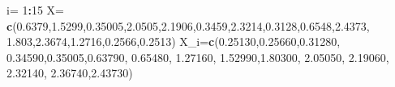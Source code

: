 \documentclass[
  a4paper,
  oneside,
  openany]{book}
\newenvironment{Shaded}{\begin{snugshade}}{\end{snugshade}}
\newcommand{\DecValTok}[1]{\textcolor[rgb]{0.00,0.00,0.81}{#1}}
\newcommand{\FloatTok}[1]{\textcolor[rgb]{0.00,0.00,0.81}{#1}}
\newcommand{\KeywordTok}[1]{\textcolor[rgb]{0.13,0.29,0.53}{\textbf{#1}}}
\newcommand{\NormalTok}[1]{#1}
\newcommand{\OperatorTok}[1]{\textcolor[rgb]{0.81,0.36,0.00}{\textbf{#1}}}
\newcommand{\StringTok}[1]{\textcolor[rgb]{0.31,0.60,0.02}{#1}}
\begin{document}
\begin{Shaded}
\begin{Highlighting}[]
\NormalTok{i=}\StringTok{ }\DecValTok{1}\OperatorTok{:}\DecValTok{15}
\NormalTok{X=}\StringTok{ }\KeywordTok{c}\NormalTok{(}\FloatTok{0.6379}\NormalTok{,}\FloatTok{1.5299}\NormalTok{,}\FloatTok{0.35005}\NormalTok{,}\FloatTok{2.0505}\NormalTok{,}\FloatTok{2.1906}\NormalTok{,}\FloatTok{0.3459}\NormalTok{,}\FloatTok{2.3214}\NormalTok{,}\FloatTok{0.3128}\NormalTok{,}\FloatTok{0.6548}\NormalTok{,}\FloatTok{2.4373}\NormalTok{,}
               \FloatTok{1.803}\NormalTok{,}\FloatTok{2.3674}\NormalTok{,}\FloatTok{1.2716}\NormalTok{,}\FloatTok{0.2566}\NormalTok{,}\FloatTok{0.2513}\NormalTok{)}
\NormalTok{X\_i=}\KeywordTok{c}\NormalTok{(}\FloatTok{0.25130}\NormalTok{,}\FloatTok{0.25660}\NormalTok{,}\FloatTok{0.31280}\NormalTok{, }\FloatTok{0.34590}\NormalTok{,}\FloatTok{0.35005}\NormalTok{,}\FloatTok{0.63790}\NormalTok{, }\FloatTok{0.65480}\NormalTok{, }\FloatTok{1.27160}\NormalTok{, }
               \FloatTok{1.52990}\NormalTok{,}\FloatTok{1.80300}\NormalTok{, }\FloatTok{2.05050}\NormalTok{, }\FloatTok{2.19060}\NormalTok{, }\FloatTok{2.32140}\NormalTok{, }\FloatTok{2.36740}\NormalTok{,}\FloatTok{2.43730}\NormalTok{)}


\end{Highlighting}
\end{Shaded}
\end{document}
